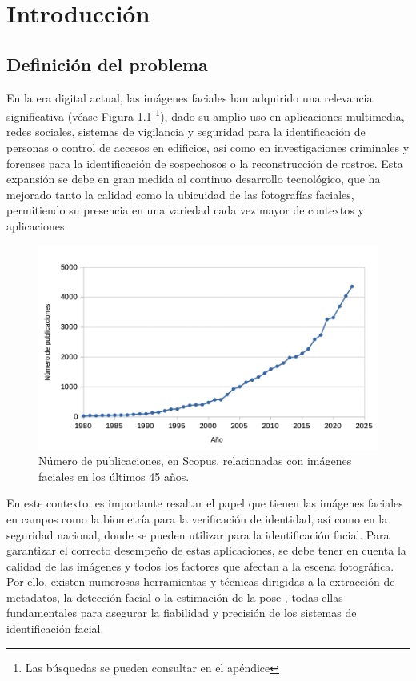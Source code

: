 \chapter{Introducción}
\thispagestyle{empty}

\section{Definición del problema}

En la era digital actual, las imágenes faciales han adquirido una relevancia significativa (véase Figura \ref{fig1} \footnote{Las búsquedas se pueden consultar en el apéndice}), dado su amplio uso  en aplicaciones multimedia, redes sociales, sistemas de vigilancia y seguridad para la identificación de personas o control de accesos en edificios, así como en investigaciones criminales y forenses para la identificación de sospechosos o la reconstrucción de rostros.
Esta expansión se debe en gran medida al continuo desarrollo tecnológico, que ha mejorado tanto la calidad como la ubicuidad de las fotografías faciales, permitiendo su presencia en una variedad cada vez mayor de contextos y aplicaciones.

\begin{figure}[h]
	\centering
	\includegraphics[scale=0.6]{imagenes/cap1/tabla1_facial_images_grande2.png}
	\caption[Número de publicaciones de imágenes faciales.]{Número de publicaciones, en Scopus, relacionadas con imágenes faciales en los últimos 45 años.}
	\label{fig1}
\end{figure}

En este contexto, es importante resaltar el papel que tienen las imágenes faciales en campos como la biometría para la verificación de identidad, así como en la seguridad nacional, donde se pueden utilizar para la identificación facial. 
Para garantizar el correcto desempeño de estas aplicaciones, se debe tener en cuenta la calidad de las imágenes y todos los factores que afectan a la escena fotográfica.
Por ello, existen numerosas herramientas y técnicas dirigidas a la extracción de metadatos, la detección facial o la estimación de la pose \cite{56}, todas ellas fundamentales para asegurar la fiabilidad y precisión de los sistemas de identificación facial.

